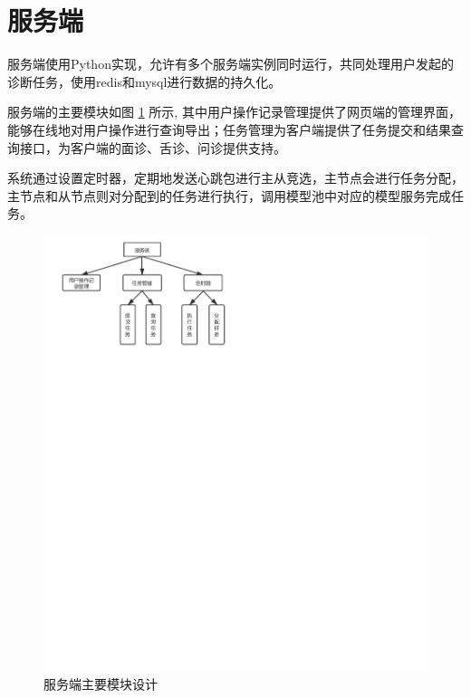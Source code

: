 \section{服务端}

服务端使用Python实现，允许有多个服务端实例同时运行，共同处理用户发起的诊断任务，使用redis和mysql进行数据的持久化。

服务端的主要模块如图 \ref{fig:server} 所示, 其中用户操作记录管理提供了网页端的管理界面，能够在线地对用户操作进行查询导出；任务管理为客户端提供了任务提交和结果查询接口，为客户端的面诊、舌诊、问诊提供支持。

系统通过设置定时器，定期地发送心跳包进行主从竞选，主节点会进行任务分配，主节点和从节点则对分配到的任务进行执行，调用模型池中对应的模型服务完成任务。


\begin{figure}[ht]
    \centering
    \includegraphics[width=15cm]{images/server.pdf}
    \caption{服务端主要模块设计}
    \label{fig:server}
\end{figure}


